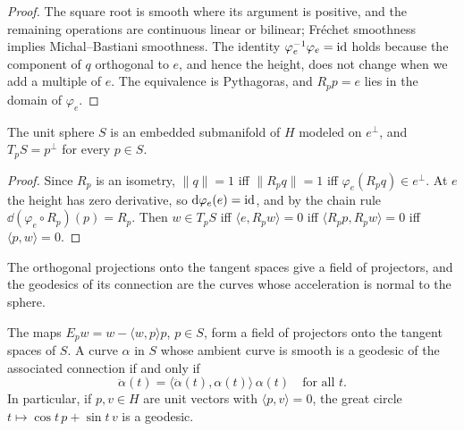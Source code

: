 \begin{proof}
  \leanok
  The square root is smooth where its argument is positive, and the remaining operations are
  continuous linear or bilinear; Fréchet smoothness implies Michal--Bastiani smoothness. The
  identity $\varphi_e^{-1}\varphi_e = \mathrm{id}$ holds because the component of $q$ orthogonal to $e$,
  and hence the height, does not change when we add a multiple of $e$. The equivalence is
  Pythagoras, and $R_p p = e$ lies in the domain of $\varphi_e$.
\end{proof}

\begin{theorem}
  \label{thm:ex-sphere}
  \leanok
  The unit sphere $S$ is an embedded submanifold of $H$ modeled on $e^\perp$, and
  $T_pS = p^\perp$ for every $p \in S$.
\end{theorem}

\begin{proof}
  \leanok
  Since $R_p$ is an isometry, $\|q\| = 1$ iff $\|R_p q\| = 1$ iff
  $\varphi_e(R_p q) \in e^\perp$. At $e$ the height has zero derivative, so
  $\mathrm{d}\varphi_e(e) = \mathrm{id}$, and by the chain rule $\dd(\varphi_e \circ R_p)(p) = R_p$. Then
  $w \in T_pS$ iff $\langle e, R_p w\rangle = 0$ iff $\langle R_p p, R_p w\rangle = 0$ iff
  $\langle p, w\rangle = 0$.
\end{proof}

The orthogonal projections onto the tangent spaces give a field of projectors, and the geodesics
of its connection are the curves whose acceleration is normal to the sphere.

\begin{theorem}
  \label{thm:ex-sphere-geodesics}
  \leanok
  The maps $E_p w = w - \langle w, p\rangle p$, $p \in S$, form a field of projectors onto
  the tangent spaces of $S$. A curve $\alpha$ in $S$ whose ambient curve is smooth is a geodesic
  of the associated connection if and only if
  \[
    \ddot\alpha(t) = \langle \ddot\alpha(t), \alpha(t)\rangle\, \alpha(t) \quad
    \text{for all } t .
  \]
  In particular, if $p, v \in H$ are unit vectors with $\langle p, v\rangle = 0$, the great
  circle $t \mapsto \cos t\, p + \sin t\, v$ is a geodesic.
\end{theorem}

